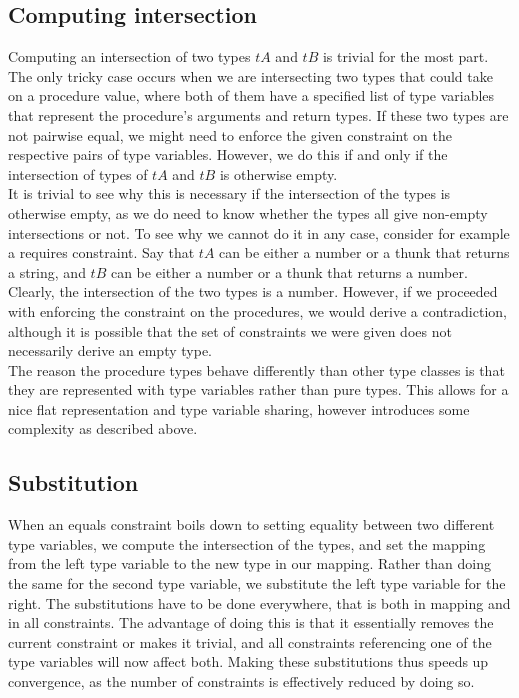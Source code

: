 \documentclass[a4paper]{article}
\begin{document}
\subsection{Computing intersection}

Computing an intersection of two types $tA$ and $tB$ is trivial for the most part.
The only tricky case occurs when we are intersecting two types that could take on a procedure
value, where both of them have a specified list of type variables that represent the
procedure's arguments and return types.
If these two types are not pairwise equal, we might need to enforce the given constraint on the
respective pairs of type variables.
However, we do this if and only if the intersection of types of $tA$ and $tB$ is otherwise empty.\\

It is trivial to see why this is necessary if the intersection of the types is otherwise empty,
as we do need to know whether the types all give non-empty intersections or not.
To see why we cannot do it in any case, consider for example a requires constraint.
Say that $tA$ can be either a number or a thunk that returns a string,
and $tB$ can be either a number or a thunk that returns a number.
Clearly, the intersection of the two types is a number.
However, if we proceeded with enforcing the constraint on the procedures,
we would derive a contradiction, although it is possible that the set of constraints
we were given does not necessarily derive an empty type.\\

The reason the procedure types behave differently than other type classes is that
they are represented with type variables rather than pure types.
This allows for a nice flat representation and type variable sharing,
however introduces some complexity as described above.

\subsection{Substitution}

When an equals constraint boils down to setting equality between two different
type variables, we compute the intersection of the types, and set the mapping from the
left type variable to the new type in our mapping.
Rather than doing the same for the second type variable, we substitute the left type
variable for the right.
The substitutions have to be done everywhere, that is both in mapping and in all constraints.
The advantage of doing this is that it essentially removes the current constraint
or makes it trivial, and all constraints referencing one of the type variables will
now affect both.
Making these substitutions thus speeds up convergence, as the number of constraints
is effectively reduced by doing so.\\
\end{document}

